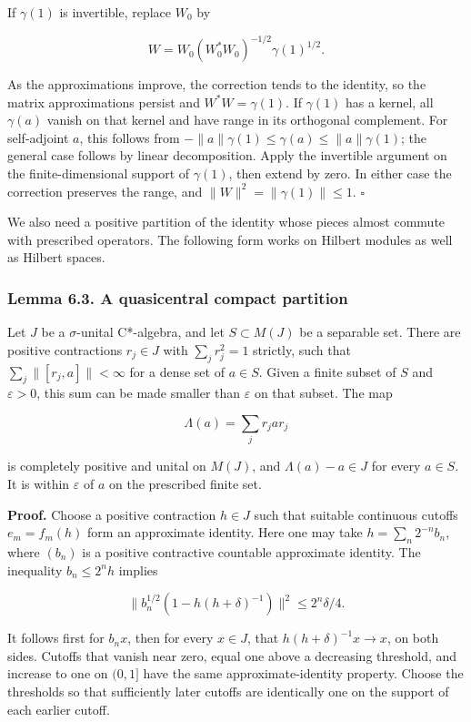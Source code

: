 \documentclass[
  11pt,
]{article}
\begin{document}
If \(\gamma(1)\) is invertible, replace \(W_0\) by

\[
W=W_0(W_0^*W_0)^{-1/2}\gamma(1)^{1/2}.
\]

As the approximations improve, the correction tends to the identity, so
the matrix approximations persist and \(W^*W=\gamma(1)\). If
\(\gamma(1)\) has a kernel, all \(\gamma(a)\) vanish on that kernel and
have range in its orthogonal complement. For self-adjoint \(a\), this
follows from \(-\|a\|\gamma(1)\leq\gamma(a)\leq\|a\|\gamma(1)\); the
general case follows by linear decomposition. Apply the invertible
argument on the finite-dimensional support of \(\gamma(1)\), then extend
by zero. In either case the correction preserves the range, and
\(\|W\|^2=\|\gamma(1)\|\leq1\). \(\square\)

We also need a positive partition of the identity whose pieces almost
commute with prescribed operators. The following form works on Hilbert
modules as well as Hilbert spaces.

\subsubsection{Lemma 6.3. A quasicentral compact
partition}\label{lemma-6.3.-a-quasicentral-compact-partition}

Let \(J\) be a \(\sigma\)-unital C*-algebra, and let \(S\subset M(J)\)
be a separable set. There are positive contractions \(r_j\in J\) with
\(\sum_j r_j^2=1\) strictly, such that \(\sum_j\|[r_j,a]\|<\infty\) for
a dense set of \(a\in S\). Given a finite subset of \(S\) and
\(\varepsilon>0\), this sum can be made smaller than \(\varepsilon\) on
that subset. The map

\[
\Lambda(a)=\sum_jr_jar_j
\]

is completely positive and unital on \(M(J)\), and \(\Lambda(a)-a\in J\)
for every \(a\in S\). It is within \(\varepsilon\) of \(a\) on the
prescribed finite set.

\textbf{Proof.} Choose a positive contraction \(h\in J\) such that
suitable continuous cutoffs \(e_m=f_m(h)\) form an approximate identity.
Here one may take \(h=\sum_n2^{-n}b_n\), where \((b_n)\) is a positive
contractive countable approximate identity. The inequality
\(b_n\leq2^nh\) implies

\[
\|b_n^{1/2}(1-h(h+\delta)^{-1})\|^2
\leq 2^n\delta/4.
\]

It follows first for \(b_nx\), then for every \(x\in J\), that
\(h(h+\delta)^{-1}x\to x\), on both sides. Cutoffs that vanish near
zero, equal one above a decreasing threshold, and increase to one on
\((0,1]\) have the same approximate-identity property. Choose the
thresholds so that sufficiently later cutoffs are identically one on the
support of each earlier cutoff.
\end{document}
